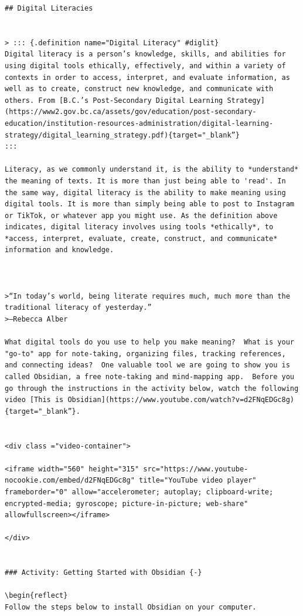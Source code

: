 \documentclass[
]{book}
\theoremstyle{definition}
\theoremstyle{definition}
\theoremstyle{definition}
\theoremstyle{definition}
\theoremstyle{remark}
\begin{document}
\begin{verbatim}
## Digital Literacies


> ::: {.definition name="Digital Literacy" #diglit}
Digital literacy is a person’s knowledge, skills, and abilities for using digital tools ethically, effectively, and within a variety of contexts in order to access, interpret, and evaluate information, as well as to create, construct new knowledge, and communicate with others. From [B.C.’s Post-Secondary Digital Learning Strategy](https://www2.gov.bc.ca/assets/gov/education/post-secondary-education/institution-resources-administration/digital-learning-strategy/digital_learning_strategy.pdf){target="_blank”}
:::

Literacy, as we commonly understand it, is the ability to *understand* the meaning of texts. It is more than just being able to 'read'. In the same way, digital literacy is the ability to make meaning using digital tools. It is more than simply being able to post to Instagram or TikTok, or whatever app you might use. As the definition above indicates, digital literacy involves using tools *ethically*, to *access, interpret, evaluate, create, construct, and communicate* information and knowledge.



>“In today’s world, being literate requires much, much more than the traditional literacy of yesterday.”
>—Rebecca Alber

What digital tools do you use to help you make meaning?  What is your "go-to" app for note-taking, organizing files, tracking references, and connecting ideas?  One valuable tool we are going to show you is called Obsidian, a free note-taking and mind-mapping app.  Before you go through the instructions in the activity below, watch the following video [This is Obsidian](https://www.youtube.com/watch?v=d2FNqEDGc8g){target="_blank”}.


<div class ="video-container">

<iframe width="560" height="315" src="https://www.youtube-nocookie.com/embed/d2FNqEDGc8g" title="YouTube video player" frameborder="0" allow="accelerometer; autoplay; clipboard-write; encrypted-media; gyroscope; picture-in-picture; web-share" allowfullscreen></iframe> 

</div>


### Activity: Getting Started with Obsidian {-}

\begin{reflect}
Follow the steps below to install Obsidian on your computer.


\end{verbatim}
\end{document}
